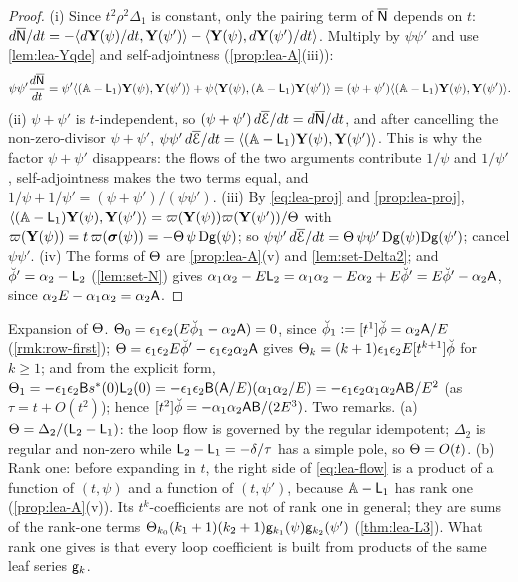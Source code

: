 \begin{proof}
(i) Since $t^2\rho^2\Delta_1$ is constant, only the pairing term of $\overline{\mathsf{N}}$ depends on $t$: $d\overline{\mathsf{N}}/dt = -\langle d\mathbf{Y}(\psi)/dt,\mathbf{Y}(\psi')\rangle - \langle\mathbf{Y}(\psi),d\mathbf{Y}(\psi')/dt\rangle$. Multiply by $\psi\psi'$ and use \cref{lem:lea-Yqde} and self-adjointness (\cref{prop:lea-A}(iii)):
\[
\psi\psi'\frac{d\overline{\mathsf{N}}}{dt} = \psi'\langle(\mathbb{A}-\mathsf{L}_1)\mathbf{Y}(\psi),\mathbf{Y}(\psi')\rangle + \psi\langle\mathbf{Y}(\psi),(\mathbb{A}-\mathsf{L}_1)\mathbf{Y}(\psi')\rangle = (\psi+\psi')\langle(\mathbb{A}-\mathsf{L}_1)\mathbf{Y}(\psi),\mathbf{Y}(\psi')\rangle .
\]
(ii) $\psi+\psi'$ is $t$-independent, so $(\psi+\psi')\,d\overline{\mathcal{E}}/dt = d\overline{\mathsf{N}}/dt$, and after cancelling the non-zero-divisor $\psi+\psi'$, $\psi\psi'\,d\overline{\mathcal{E}}/dt = \langle(\mathbb{A}-\mathsf{L}_1)\mathbf{Y}(\psi),\mathbf{Y}(\psi')\rangle$. This is why the factor $\psi+\psi'$ disappears: the flows of the two arguments contribute $1/\psi$ and $1/\psi'$, self-adjointness makes the two terms equal, and $1/\psi + 1/\psi' = (\psi+\psi')/(\psi\psi')$.
(iii) By \eqref{eq:lea-proj} and \cref{prop:lea-proj}, $\langle(\mathbb{A}-\mathsf{L}_1)\mathbf{Y}(\psi),\mathbf{Y}(\psi')\rangle = \varpi(\mathbf{Y}(\psi))\varpi(\mathbf{Y}(\psi'))/\Theta$ with $\varpi(\mathbf{Y}(\psi)) = t\,\varpi(\boldsymbol{\sigma}(\psi)) = -\Theta\,\psi\,\mathrm{D}\mathsf{g}(\psi)$; so $\psi\psi'\,d\overline{\mathcal{E}}/dt = \Theta\,\psi\psi'\,\mathrm{D}\mathsf{g}(\psi)\mathrm{D}\mathsf{g}(\psi')$; cancel $\psi\psi'$.
(iv) The forms of $\Theta$ are \cref{prop:lea-A}(v) and \cref{lem:set-Delta2}; and $\breve{\phi}' = \alpha_2 - \mathsf{L}_2$ (\cref{lem:set-N}) gives $\alpha_1\alpha_2 - E\mathsf{L}_2 = \alpha_1\alpha_2 - E\alpha_2 + E\breve{\phi}' = E\breve{\phi}' - \alpha_2\mathsf{A}$, since $\alpha_2E - \alpha_1\alpha_2 = \alpha_2\mathsf{A}$.
\end{proof}

Expansion of $\Theta$. $\Theta_0 = \epsilon_1\epsilon_2(E\breve{\phi}_1 - \alpha_2\mathsf{A}) = 0$, since $\breve{\phi}_1 := [t^1]\breve{\phi} = \alpha_2\mathsf{A}/E$ (\cref{rmk:row-first}); $\Theta = \epsilon_1\epsilon_2E\breve{\phi}' - \epsilon_1\epsilon_2\alpha_2\mathsf{A}$ gives $\Theta_k = (k+1)\epsilon_1\epsilon_2E[t^{k+1}]\breve{\phi}$ for $k\geq 1$; and from the explicit form, $\Theta_1 = -\epsilon_1\epsilon_2\mathsf{B}s^{\ast}(0)\mathsf{L}_2(0) = -\epsilon_1\epsilon_2\mathsf{B}(\mathsf{A}/E)(\alpha_1\alpha_2/E) = -\epsilon_1\epsilon_2\alpha_1\alpha_2\mathsf{A}\mathsf{B}/E^2$ (as $\tau = t + O(t^2)$); hence $[t^2]\breve{\phi} = -\alpha_1\alpha_2\mathsf{A}\mathsf{B}/(2E^3)$. Two remarks. (a) $\Theta = \Delta_2/(\mathsf{L}_2-\mathsf{L}_1)$: the loop flow is governed by the regular idempotent; $\Delta_2$ is regular and non-zero while $\mathsf{L}_2-\mathsf{L}_1 = -\delta/\tau$ has a simple pole, so $\Theta = O(t)$. (b) Rank one: before expanding in $t$, the right side of \eqref{eq:lea-flow} is a product of a function of $(t,\psi)$ and a function of $(t,\psi')$, because $\mathbb{A}-\mathsf{L}_1$ has rank one (\cref{prop:lea-A}(v)). Its $t^k$-coefficients are not of rank one in general; they are sums of the rank-one terms $\Theta_{k_0}(k_1+1)(k_2+1)\mathsf{g}_{k_1}(\psi)\mathsf{g}_{k_2}(\psi')$ (\cref{thm:lea-L3}). What rank one gives is that every loop coefficient is built from products of the same leaf series $\mathsf{g}_k$.

